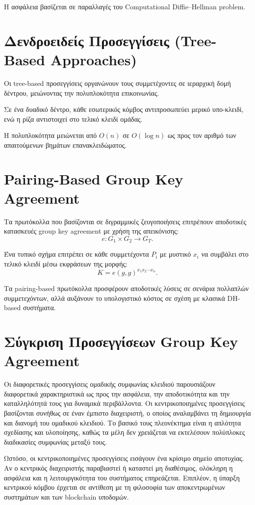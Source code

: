 \documentclass[12pt,a4paper]{report}
\begin{document}
Η ασφάλεια βασίζεται σε παραλλαγές του Computational Diffie--Hellman problem.

\section{Δενδροειδείς Προσεγγίσεις (Tree-Based Approaches)}

Οι tree-based προσεγγίσεις οργανώνουν τους συμμετέχοντες σε ιεραρχική δομή δέντρου, μειώνοντας την πολυπλοκότητα επικοινωνίας.

Σε ένα δυαδικό δέντρο, κάθε εσωτερικός κόμβος αντιπροσωπεύει μερικό υπο-κλειδί, ενώ η ρίζα αντιστοιχεί στο τελικό κλειδί ομάδας.

Η πολυπλοκότητα μειώνεται από $O(n)$ σε $O(\log n)$ ως προς τον αριθμό των απαιτούμενων βημάτων επανακλειδώματος.

\section{Pairing-Based Group Key Agreement}

Τα πρωτόκολλα που βασίζονται σε διγραμμικές ζευγοποιήσεις επιτρέπουν αποδοτικές κατασκευές group key agreement με χρήση της απεικόνισης:
\[
e: G_1 \times G_2 \rightarrow G_T.
\]

Ένα τυπικό σχήμα επιτρέπει σε κάθε συμμετέχοντα $P_i$ με μυστικό $x_i$ να συμβάλει στο τελικό κλειδί μέσω εκφράσεων της μορφής:
\[
K = e(g,g)^{x_1 x_2 \cdots x_n}.
\]

Τα pairing-based πρωτόκολλα προσφέρουν αποδοτικές λύσεις σε σενάρια πολλαπλών συμμετεχόντων, αλλά αυξάνουν το υπολογιστικό κόστος σε σχέση με κλασικά DH-based συστήματα.

\section{Σύγκριση Προσεγγίσεων Group Key Agreement}

Οι διαφορετικές προσεγγίσεις ομαδικής συμφωνίας κλειδιού παρουσιάζουν διαφορετικά χαρακτηριστικά ως προς την ασφάλεια, την αποδοτικότητα και την καταλληλότητά τους για δυναμικά περιβάλλοντα. Οι κεντρικοποιημένες προσεγγίσεις βασίζονται συνήθως σε έναν έμπιστο διαχειριστή, ο οποίος αναλαμβάνει τη δημιουργία και διανομή του ομαδικού κλειδιού. Το βασικό τους πλεονέκτημα είναι η απλότητα σχεδίασης και υλοποίησης, καθώς τα μέλη δεν χρειάζεται να εκτελέσουν πολύπλοκες διαδικασίες συμφωνίας μεταξύ τους.

Ωστόσο, οι κεντρικοποιημένες προσεγγίσεις εισάγουν ένα κρίσιμο σημείο αποτυχίας. Αν ο κεντρικός διαχειριστής παραβιαστεί ή καταστεί μη διαθέσιμος, ολόκληρη η ασφάλεια και η λειτουργικότητα του συστήματος επηρεάζεται. Επιπλέον, η ύπαρξη κεντρικού κόμβου έρχεται σε αντίθεση με τη φιλοσοφία των αποκεντρωμένων συστημάτων και των blockchain υποδομών.
\end{document}
